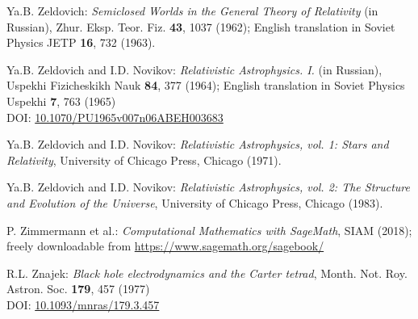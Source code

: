 \begin{thebibliography}{123}

Ya.B. Zeldovich:
{\em Semiclosed Worlds in the General Theory of Relativity} (in Russian),
Zhur. Eksp. Teor. Fiz. {\bf 43}, 1037 (1962); English translation in
Soviet Physics JETP {\bf 16}, 732 (1963).

Ya.B. Zeldovich and I.D. Novikov:
{\em Relativistic Astrophysics. I.} (in Russian),
Uspekhi Fizicheskikh Nauk {\bf 84}, 377 (1964);
English translation in Soviet Physics Uspekhi {\bf 7}, 763 (1965)\\
DOI: \href{https://doi.org/10.1070/PU1965v007n06ABEH003683}{10.1070/PU1965v007n06ABEH003683}

Ya.B. Zeldovich and I.D. Novikov:
{\em Relativistic Astrophysics, vol. 1: Stars and Relativity},
University of Chicago Press, Chicago (1971).

Ya.B. Zeldovich and I.D. Novikov:
{\em Relativistic Astrophysics, vol. 2: The Structure and Evolution of the Universe},
University of Chicago Press, Chicago (1983).

P. Zimmermann et al.: {\em Computational Mathematics with SageMath}, SIAM (2018);
freely downloadable from \url{https://www.sagemath.org/sagebook/}

R.L. Znajek:
{\em Black hole electrodynamics and the Carter tetrad},
Month. Not. Roy. Astron. Soc. {\bf 179}, 457 (1977)\\
DOI: \href{https://doi.org/10.1093/mnras/179.3.457}{10.1093/mnras/179.3.457}

\end{thebibliography}
